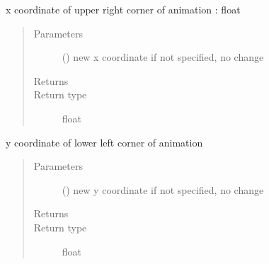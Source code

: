 \documentclass[letterpaper,10pt,english]{sphinxmanual}
\begin{document}
\begin{fulllineitems}
\begin{fulllineitems}
\begin{quote}
\begin{description}
\end{description}\end{quote}

\end{fulllineitems}


\begin{fulllineitems}
\label{\detokenize{Reference:salabim.Environment.x1}}
x coordinate of upper right corner of animation : float
\begin{quote}\begin{description}
\item[{Parameters}] \leavevmode
{} () \textendash{} new x coordinate 
if not specified, no change

\item[{Returns}] \leavevmode
{}

\item[{Return type}] \leavevmode
float

\end{description}\end{quote}

\end{fulllineitems}


\begin{fulllineitems}
\label{\detokenize{Reference:salabim.Environment.y0}}
y coordinate of lower left corner of animation
\begin{quote}\begin{description}
\item[{Parameters}] \leavevmode
{} () \textendash{} new y coordinate 
if not specified, no change

\item[{Returns}] \leavevmode
{}

\item[{Return type}] \leavevmode
float

\end{description}\end{quote}


\end{fulllineitems}
\end{fulllineitems}
\end{document}

